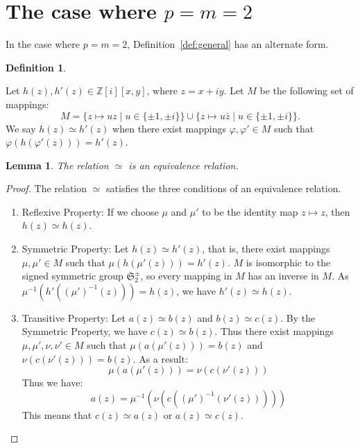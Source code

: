 \documentclass[12pt]{article}
\newtheorem{lemma}[theorem]{Lemma}
\theoremstyle{definition}
\newtheorem{definition}[theorem]{Definition}
\numberwithin{equation}{section}
\begin{document}
\section{The case where \( p = m = 2\)}


In the case where \( p = m = 2\), Definition~\ref{def:general} has an alternate form.



\begin{definition}
\label{def:2D}

Let \( h(z), h'(z) \in \mathbb{Z} [i][x,y] \),
where \( z = x + iy \).
Let \( M \) be the following set of mappings: 
\[
M = \{ z \mapsto uz \mid u \in \{ \pm 1, \pm i \} \}  
\cup \{ z\mapsto u \bar{z} \mid u \in \{ \pm 1, \pm i \} \}.  
\]
We say \( h(z) \simeq h'(z) \) when there exist mappings \( \varphi, \varphi' \in M \)
such that \( \varphi( h( \varphi'( z ) ) )  = h'(z) \).


\end{definition}

\begin{lemma}
The relation \( \simeq \) is an equivalence relation.
\end{lemma}

\begin{proof}
The relation \( \simeq \) satisfies the three conditions of an equivalence relation.
\begin{enumerate}
\item Reflexive Property: If we choose \( \mu \) and \( \mu'\) to be the identity map \( z \mapsto z \), 
then \( h(z) \simeq h(z) \).

\item Symmetric Property: Let  \( h(z) \simeq h'(z) \), that is, there exist mappings 
\( \mu, \mu' \in M \)
such that \( \mu( h( \mu'( z ) ) )  = h'(z) \).
\(M\) is isomorphic to the signed symmetric group \( \mathfrak{S}_2^\pm \), so every mapping in \(M\)
has an inverse in \(M\). As  \( \mu^{-1}( h'( (\mu')^{-1}( z ) ) )  = h(z) \),
we have \( h'(z) \simeq h(z) \).

\item Transitive Property: Let \( a(z) \simeq b(z) \) and \( b(z) \simeq c(z) \). By the 
Symmetric Property, we have \( c(z) \simeq b(z) \). Thus there exist mappings
\( \mu, \mu', \nu, \nu' \in M \) such that \( \mu( a( \mu'( z ) ) )  = b(z) \) and 
\( \nu( c( \nu'( z ) ) )  = b(z) \). As a result:
\[
\mu( a( \mu'( z ) ) ) = \nu( c( \nu'( z ) ) )  
\]
Thus we have: 
\[
a(  z  ) = \mu^{-1}( \nu( c( (\mu')^{-1}( \nu'( z ) ) ) ) )
\]
This means that \( c(z) \simeq a(z) \) or \( a(z) \simeq c(z) \).
\end{enumerate}
\end{proof}
\end{document}
